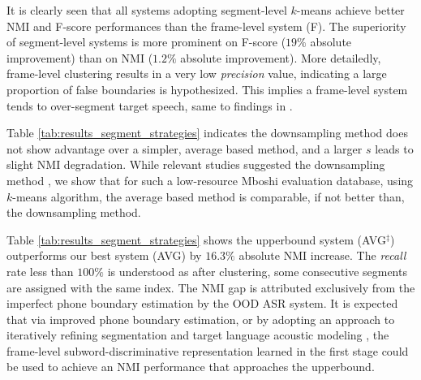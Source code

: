 \documentclass[a4paper]{article}
\begin{document}
It is clearly seen that all systems adopting segment-level $k$-means achieve better NMI and F-score performances than the frame-level system (F). The superiority of segment-level systems is more prominent on F-score ($19\%$ absolute improvement)  than on NMI ($1.2\%$ absolute improvement). More detailedly, frame-level clustering results in a very low \textit{precision} value, indicating a large proportion of false boundaries  is hypothesized. 
This implies a frame-level system tends to over-segment target speech, same to findings in \cite{wu2018optimizing,feng2019_TASLP}.  

Table \ref{tab:results_segment_strategies} indicates the downsampling method does not show advantage over a simpler, average based method, and a larger $s$ leads to slight NMI degradation. While relevant studies suggested the downsampling method \cite{kamper2017embeded,Bhati2019unsupervised}, we show that for  such a low-resource Mboshi evaluation database, using $k$-means algorithm,  the average based method is comparable, if not better than, the downsampling method.

Table \ref{tab:results_segment_strategies} shows the upperbound system (AVG$^\ddagger$) outperforms our best system (AVG) by $16.3\%$ absolute NMI increase. The \textit{recall} rate less than $100\%$ is understood as after clustering, some   consecutive segments are assigned with the same index. The   NMI gap is attributed exclusively from the imperfect phone boundary estimation by the OOD ASR system. It is expected that via improved phone boundary estimation, or by adopting an approach to iteratively refining segmentation and target language acoustic modeling \cite{kamper2017embeded}, the  frame-level subword-discriminative representation learned in the first stage  could be used to achieve an NMI performance that approaches the upperbound. 






\end{document}
